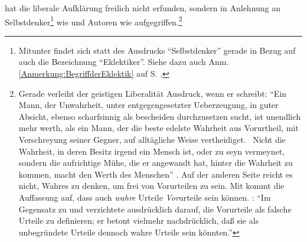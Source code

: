  hat die liberale Aufklärung freilich nicht
erfunden, sondern in Anlehnung an Selbstdenker\footnote{Mitunter
findet sich statt des Ausdrucks \enquote{Selbstdenker} gerade in Bezug auf
 auch die Bezeichnung \enquote{Eklektiker}. Siehe
dazu auch Anm. \ref{Anmerkung:BegriffderEklektik} auf S.
\pageref{Anmerkung:BegriffderEklektik}.} wie  und
Autoren wie  aufgegriffen.\footnote{Gerade
 verleiht der geistigen Liberalität Ausdruck,
wenn er schreibt:
\label{Zitat:Lessing:EineDuplik}
  \enquote{Ein Mann, der Unwahrheit, unter entgegengesetzter Ueberzeugung, in
  guter Absicht, ebenso scharfsinnig als bescheiden durchzusetzen sucht, ist
  unendlich mehr werth, als ein Mann, der die beste edelste Wahrheit aus
  Vorurtheil, mit Verschreyung seiner Gegner, auf alltägliche Weise
  vertheidiget.
  \punkt\ Nicht die Wahrheit, in deren Besitz irgend ein Mensch ist, oder zu
  seyn vermeynet, sondern die aufrichtige Mühe, die er angewandt hat, hinter
  die Wahrheit zu kommen, macht den Werth des
  Menschen} \parencite[][S. 23\,f.]{Lessing:EineDuplik1897}.
Auf der anderen Seite reicht es nicht, Wahres zu denken, um frei von Vorurteilen
zu sein. Mit  kommt die
Auffassung auf, dass auch \emph{wahre} Urteile \emph{Vor}urteile sein
können. \cite[Vgl.][89]{Schneiders:PraktischeLogik1980}: \enquote{Im
Gegensatz zu 
und 
verzichtete  ausdrücklich
darauf, die Vorurteile als falsche Urteile zu definieren; er betont vielmehr
nachdrücklich, daß sie als unbegründete Urteile dennoch wahre Urteile sein
könnten.}}

